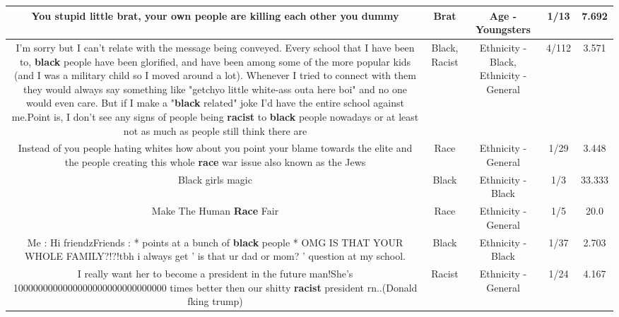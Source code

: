 \documentclass[11pt]{article}
\newlength\mylength
\begin{document}
\begin{center}
\begin{longtable}{|C{.65\mylength}|C{.30\mylength}|C{.12\mylength}|C{.12\mylength}|C{.12\mylength}|}
  \small You stupid little \textbf{brat}, your own people are killing each other you dummy\normalsize   & Brat & Age - Youngsters & 1/13 & 7.692 \\  \hline
  \small I'm sorry but I can't relate with the message being conveyed. Every school that I have been to, \textbf{black} people have been glorified, and have been among some of the more popular kids (and I was a military child so I moved around a lot). Whenever I tried to connect with them they would always say something like "getchyo little white-ass outa here boi" and no one would even care. But if I make a "\textbf{black} related" joke I'd have the entire school against me.Point is, I don't see any signs of people being \textbf{racist} to \textbf{black} people nowadays or at least not as much as people still think there are\normalsize   & Black, Racist & Ethnicity - Black, Ethnicity - General & 4/112 & 3.571 \\  \hline
  \small Instead of you people hating whites how about you point your blame towards the elite and the people creating this whole \textbf{race} war issue also known as the Jews\normalsize   & Race & Ethnicity - General & 1/29 & 3.448 \\  \hline
  \small Black girls magic\normalsize   & Black & Ethnicity - Black & 1/3 & 33.333 \\  \hline
  \small Make The Human \textbf{Race} Fair\normalsize   & Race & Ethnicity - General & 1/5 & 20.0 \\  \hline
  \small Me : Hi friendzFriends : * points at a bunch of \textbf{black} people * OMG IS THAT YOUR WHOLE FAMILY?!?!tbh i always get ' is that ur dad or mom? ' question at my school.\normalsize   & Black & Ethnicity - Black & 1/37 & 2.703 \\  \hline
  \small I really want her to become a president in the future man!She's 1000000000000000000000000000000 times better then our shitty \textbf{racist} president rn..(Donald fking trump)\normalsize   & Racist & Ethnicity - General & 1/24 & 4.167 \\  \hline

\end{longtable}
\end{center}
\end{document}
